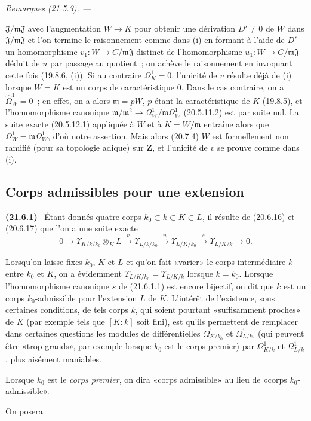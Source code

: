 \documentclass[10pt,oneside]{book}
\makeatletter
\newcommand{\setmanualcurrentlabel}[1]{\def\@currentlabel{#1}}
\newcommand{\oldpage}[2][]{%
  \setcounter{footnote}{0}%
  \marginpar{\scriptsize\textbf{#1}~|~#2}\ignorespaces}
\newenvironment{env}[1][]{\setmanualcurrentlabel{#1}\par\medskip\noindent\textbf{(#1)}\ }{\par}
\newenvironment{remarks}[1][]{%
  \setmanualcurrentlabel{#1}\par\medskip\noindent\itshape Remarques (#1). ---\ }{\par}
\makeatother
\begin{document}
\begin{remarks}[21.5.3]
\begin{enumerate}
  $\mathfrak J/\mathfrak m\mathfrak J$ avec l'augmentation $W\to K$ pour
  obtenir une dérivation $D'\ne0$ de $W$ dans
  $\mathfrak J/\mathfrak m\mathfrak J$ et l'on termine le raisonnement comme
  dans (i) en formant à l'aide de $D'$ un homomorphisme
  $v_1:W\to C/\mathfrak m\mathfrak J$ distinct de l'homomorphisme
  $u_1:W\to C/\mathfrak m\mathfrak J$ déduit de $u$ par passage au quotient~;
  on achève le raisonnement en invoquant cette fois (19.8.6, (i)). Si au
  contraire $\Omega^1_K=0$, l'unicité de $v$ résulte déjà de (i) lorsque
  $W=K$ est un corps de caractéristique $0$. Dans le cas contraire, on a
  $\widehat{\Omega}^1_W=0$~; en effet, on a alors $\mathfrak m=pW$, $p$ étant
  la caractéristique de $K$ (19.8.5), et l'homomorphisme canonique
  $\mathfrak m/\mathfrak m^2\to\Omega^1_W/\mathfrak m\Omega^1_W$ (20.5.11.2)
  est par suite nul. La suite exacte (20.5.12.1) appliquée à $W$ et à
  $K=W/\mathfrak m$ entraîne alors que $\Omega^1_W=\mathfrak m\Omega^1_W$,
  d'où notre assertion. Mais alors (20.7.4) $W$ est formellement non ramifié
  (pour sa topologie adique) sur $\mathbf Z$, et l'unicité de $v$ se prouve
  comme dans (i).
\end{enumerate}
\end{remarks}

\oldpage[0\textsubscript{IV-1}]{167}
\subsection{Corps admissibles pour une extension}
\label{section:0.21.6-fr}

\begin{env}[21.6.1]
\label{0.21.6.1-fr}
Étant donnés quatre corps $k_0\subset k\subset K\subset L$, il résulte de
(20.6.16) et (20.6.17) que l'on a une suite exacte
\begin{equation}
\tag{21.6.1.1}
\label{0.21.6.1.1-fr}
0\to\Upsilon_{K/k/k_0}\otimes_KL\xrightarrow{v}\Upsilon_{L/k/k_0}
\xrightarrow{u}\Upsilon_{L/K/k_0}\xrightarrow{s}\Upsilon_{L/K/k}\to0.
\end{equation}

Lorsqu'on laisse fixes $k_0$, $K$ et $L$ et qu'on fait «varier» le corps
intermédiaire $k$ entre $k_0$ et $K$, on a évidemment
$\Upsilon_{L/K/k_0}=\Upsilon_{L/K/k}$ lorsque $k=k_0$. Lorsque
l'homomorphisme canonique $s$ de (21.6.1.1) est encore bijectif, on dit que
$k$ est un corps $k_0$-admissible pour l'extension $L$ de $K$. L'intérêt de
l'existence, sous certaines conditions, de tels corps $k$, qui soient pourtant
«suffisamment proches» de $K$ (par exemple tels que $[K:k]$ soit fini), est
qu'ils permettent de remplacer dans certaines questions les modules de
différentielles $\Omega^1_{K/k_0}$ et $\Omega^1_{L/k_0}$ (qui peuvent être
«trop grands», par exemple lorsque $k_0$ est le corps premier) par
$\Omega^1_{K/k}$ et $\Omega^1_{L/k}$, plus aisément maniables.

Lorsque $k_0$ est le \emph{corps premier}, on dira «corps admissible» au lieu
de «corps $k_0$-admissible».
 
On posera
\end{env}
\end{document}
